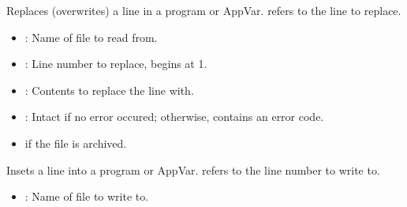 \documentclass[letterpaper,10pt,english]{sphinxmanual}
\begin{document}
\begin{description}
\begin{description}
\end{description}

\sphinxAtStartPar
Replaces (overwrites) a line in a program or AppVar.  refers to the line to replace.
\begin{description}
\begin{itemize}
\item {} 
\sphinxAtStartPar
{}: Name of file to read from.

\item {} 
\sphinxAtStartPar
{}: Line number to replace, begins at 1.

\item {} 
\sphinxAtStartPar
{}: Contents to replace the line with.

\end{itemize}

\begin{itemize}
\item {} 
\sphinxAtStartPar
{}: Intact if no error occured; otherwise, contains an error code.

\end{itemize}

\begin{itemize}
\item {} 
\sphinxAtStartPar
{} if the file is archived.

\end{itemize}

\end{description}

\sphinxAtStartPar
Insets a line into a program or AppVar.  refers to the line number to write to.
\begin{description}
\begin{itemize}
\item {} 
\sphinxAtStartPar
{}: Name of file to write to.


\end{itemize}
\end{description}
\end{description}
\end{document}
